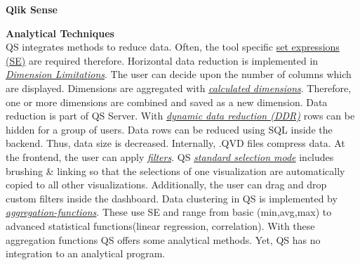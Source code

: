 \noindent \textbf{Qlik Sense}
\par
\textbf{Analytical Techniques}\\
QS integrates methods to reduce data. Often, the tool specific \href{https://help.qlik.com/en-US/sense/3.2/Subsystems/Hub/Content/ChartFunctions/SetAnalysis/set-analysis-expressions.htm}{set expressions (SE)} are required therefore. 
Horizontal data reduction is implemented in \href{https://help.qlik.com/en-US/sense/3.2/Content/Videos/Videos-dimensions-limitations.htm}{\textit{Dimension Limitations}}. The user can decide upon the number of columns which are displayed. 
Dimensions are aggregated with \href{https://help.qlik.com/en-US/sense/3.2/Subsystems/Hub/Content/Dimensions/calculated-dimensions.htm}{\textit{calculated dimensions}}. Therefore, one or more dimensions are combined and saved as a new dimension.
Data reduction is part of QS Server. With \href{https://help.qlik.com/en-US/sense/2.1/Subsystems/Hub/Content/Scripting/Security/dynamic-data-reduction.htm}{\textit{dynamic data reduction (DDR)}} rows can be hidden for a group of users. Data rows can be reduced using SQL inside the backend. Thus, data size is decreased. Internally, .QVD files compress data. 
At the frontend, the user can apply \href{https://help.qlik.com/en-US/sense/2.1/Subsystems/Hub/Content/Visualizations/FilterPane/filter-pane.htm}{\textit{filters}}. QS \href{https://help.qlik.com/en-US/sense/2.1/Content/Videos/Videos-assoc-selection-model.htm}{\textit{standard selection mode}} includes brushing \& linking so that the selections of one visualization are automatically copied to all other visualizations. Additionally, the user can drag and drop custom filters inside the dashboard. 
Data clustering in QS is implemented by \href{https://help.qlik.com/en-US/sense/3.2/Subsystems/Hub/Content/Scripting/AggregationFunctions/aggregation-functions.htm}{\textit{aggregation-functions}}. These use SE and range from basic (min,avg,max) to advanced statistical functions(linear regression, correlation). With these aggregation functions QS offers some analytical methods. Yet, QS has no integration to an analytical program.
\par

